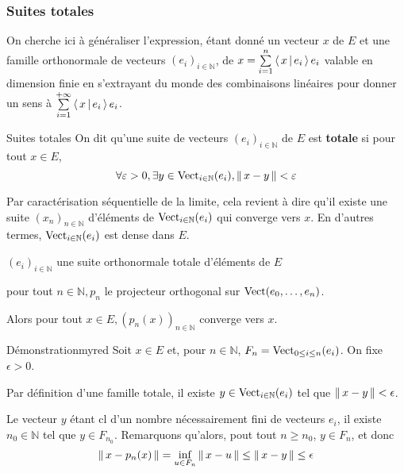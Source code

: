     \subsubsection{Suites totales}

    On cherche ici à généraliser l’expression, étant donné un vecteur $x$ de $E$ et une famille orthonormale de vecteurs $(e_i)_{i \in \mathbb{N}}$, de $x = \sum\limits_{i =1}^n \left<\,x\,\middle|\,e_i\,\right> e_i$ valable en dimension finie en s’extrayant du monde des combinaisons linéaires pour donner un sens à $\sum\limits_{i=1}^{+\infty} \left<\,x\,\middle|\,e_i\,\right> e_i$.

    \begin{defi}{Suites totales}{}
        On dit qu’une suite de vecteurs $(e_i)_{i \in \mathbb{N}}$ de $E$ est \textbf{totale} si pour tout $x \in E$, 
        \[ \forall \varepsilon > 0, \exists y \in \operatorname{Vect}_{i \in \mathbb{N}}(e_i), \left\lVert\,x-y\,\right\rVert < \varepsilon \] 
    \end{defi}

    Par caractérisation séquentielle de la limite, cela revient à dire qu’il existe une suite $(x_n)_{n \in \mathbb{N}}$ d’éléments de $\operatorname{Vect}_{i \in \mathbb{N}}(e_i)$ qui converge vers $x$. En d’autres termes, $\operatorname{Vect}_{i \in \mathbb{N}}(e_i)$ est dense dans $E$.

    \begin{theo}{}{}
        \begin{soient}
            \item $(e_i)_{i \in \mathbb{N}}$ une suite orthonormale totale d’éléments de $E$
            \item pour tout $n \in \mathbb{N}, p_n$ le projecteur orthogonal sur $\operatorname{Vect}(e_0, \ldots, e_n)$. 
        \end{soient}
        Alors pour tout $x \in E, (p_n(x))_{n \in \mathbb{N}}$ converge vers $x$.
    \end{theo}

    \begin{demo}{Démonstration}{myred}
        Soit $x \in E$ et, pour $n \in \mathbb{N}$, $F_n = \operatorname{Vect}_{0 \leq i \leq n}(e_i)$. On fixe $\epsilon > 0$.

        Par définition d’une famille totale, il existe $y \in \operatorname{Vect}_{i \in \mathbb{N}}(e_i)$ tel que $\left\lVert\,x - y\,\right\rVert < \epsilon$.

        Le vecteur $y$ étant cl d’un nombre nécessairement fini de vecteurs $e_i$, il existe $n_0 \in \mathbb{N}$ tel que $y \in F_{n_0}$. Remarquons qu’alors, pout tout $n \geq n_0$, $y \in F_n$, et donc 
        \[ \left\lVert\,x - p_n(x)\,\right\rVert = \inf_{u \in F_n} \left\lVert\,x - u\,\right\rVert \leq \left\lVert\,x - y\,\right\rVert \leq \epsilon \]
    \end{demo}

